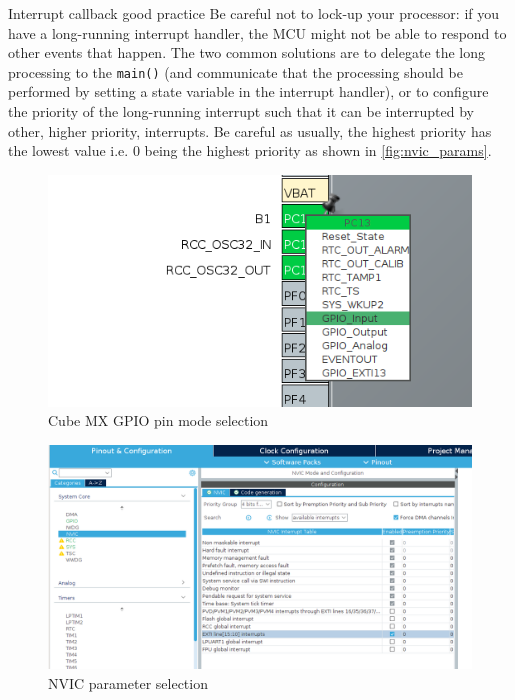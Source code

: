 \begin{bclogo}[couleur = gray!20, arrondi = 0.2, logo=\bcinfo]{Interrupt callback good practice}
Be careful not to lock-up your processor: if you have a long-running interrupt handler, the MCU might not be able to respond to other events that happen.
The two common solutions are to delegate the long processing to the \texttt{main()} (and communicate that the processing should be performed by setting a state variable in the interrupt handler), or to configure the priority of the long-running interrupt such that it can be interrupted by other, higher priority, interrupts. Be careful as usually, the highest priority has the lowest value i.e. 0 being the highest priority as shown in \autoref{fig:nvic_params}.
\end{bclogo}

\begin{figure}[h]
    \centering
    \includegraphics[scale=0.4]{figures/gpio_exti_select.png}
    \caption{Cube MX GPIO pin mode selection}
    \label{fig:gpio_exti_select}
\end{figure}

\begin{figure}[h]
    \centering
    \includegraphics[scale=0.4]{figures/nvic_exti_select.png}
    \caption{NVIC parameter selection}
    \label{fig:nvic_params}
\end{figure}


